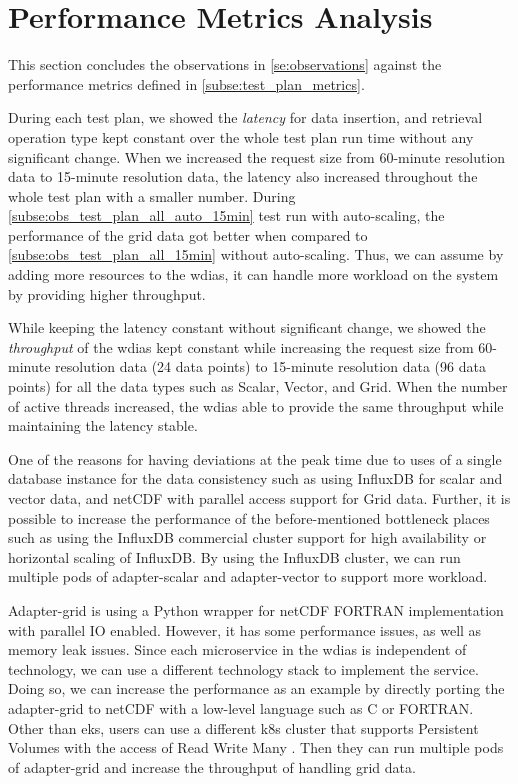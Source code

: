 \section{Performance Metrics Analysis}
\label{se:discussion}

This section concludes the observations in \cref{se:observations} against the performance metrics defined in \cref{subse:test_plan_metrics}.

During each test plan, we showed the \emph{latency} for data insertion, and retrieval operation type kept constant over the whole test plan run time without any significant change. When we increased the request size from 60-minute resolution data to 15-minute resolution data, the latency also increased throughout the whole test plan with a smaller number.
During \cref{subse:obs_test_plan_all_auto_15min} test run with auto-scaling, the performance of the grid data got better when compared to \cref{subse:obs_test_plan_all_15min} without auto-scaling. Thus, we can assume by adding more resources to the \acrshort{wdias}, it can handle more workload on the system by providing higher throughput.

While keeping the latency constant without significant change, we showed the \emph{throughput} of the \acrshort{wdias} kept constant while increasing the request size from 60-minute resolution data (24 data points) to 15-minute resolution data (96 data points) for all the data types such as Scalar, Vector, and Grid. When the number of active threads increased, the \acrshort{wdias} able to provide the same throughput while maintaining the latency stable.

One of the reasons for having deviations at the peak time due to uses of a single database instance for the data consistency such as using InfluxDB for scalar and vector data, and netCDF with parallel access support for Grid data. Further, it is possible to increase the performance of the before-mentioned bottleneck places such as using the InfluxDB commercial cluster support for high availability or horizontal scaling of InfluxDB. By using the InfluxDB cluster, we can run multiple pods of adapter-scalar and adapter-vector to support more workload.

Adapter-grid is using a Python wrapper for netCDF FORTRAN implementation with parallel IO enabled. However, it has some performance issues, as well as memory leak issues. Since each microservice in the \acrshort{wdias} is independent of technology, we can use a different technology stack to implement the service. Doing so, we can increase the performance as an example by directly porting the adapter-grid to netCDF with a low-level language such as C or FORTRAN. Other than \acrshort{eks}, users can use a different \acrshort{k8s} cluster that supports Persistent Volumes with the access of Read Write Many \cite{LinuxFoundationPersistentKubernetes}. Then they can run multiple pods of adapter-grid and increase the throughput of handling grid data.

